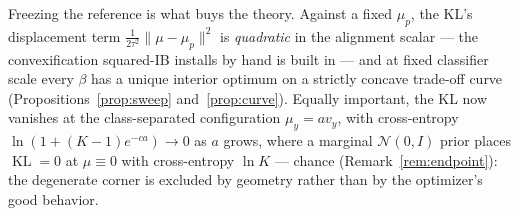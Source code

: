 \documentclass{article} %
\newcommand{\KLd}{\operatorname{KL}}
\newcommand{\Ncal}{\mathcal{N}}
\begin{document}
Freezing the reference is what buys the theory. Against a fixed $\mu_p$, the KL's
displacement term $\tfrac{1}{2\tau^2}\|\mu - \mu_p\|^2$ is \emph{quadratic} in the
alignment scalar --- the convexification squared-IB
\citep{kolchinsky2019caveats} installs by hand is built in --- and at fixed classifier
scale every $\beta$ has a unique interior optimum on a strictly concave trade-off curve
(Propositions~\ref{prop:sweep} and~\ref{prop:curve}). Equally important, the KL now
vanishes at the class-separated configuration $\mu_y = a v_y$, with cross-entropy
$\ln(1 + (K{-}1)e^{-ca}) \to 0$ as $a$ grows, where a marginal $\Ncal(0,I)$ prior
places $\KLd = 0$ at $\mu \equiv 0$ with cross-entropy $\ln K$ --- chance
(Remark~\ref{rem:endpoint}): the degenerate corner is excluded by geometry rather than
by the optimizer's good behavior.
\end{document}
